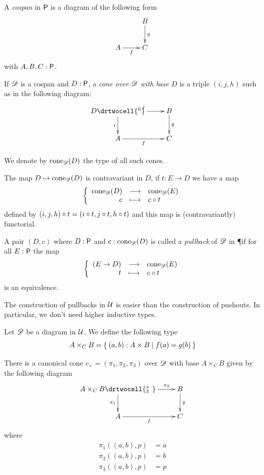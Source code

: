 \begin{defn}
  A \emph{cospan} in $\P$ is a diagram of the following form
  \[\xymatrix{& B \ar^g[d] \\ A \ar_f[r] & C}\]
  with $A,B,C:\P$.
\end{defn}

\begin{defn}
  If $\Ddiag$ is a cospan and $D:\P$, a \emph{cone over $\Ddiag$ with
    base $D$} is a triple $(i,j,h)$ such as in the following diagram:
  \[\uppercurveobject{{ }}\lowercurveobject{{ }}\twocellhead{{ }}
  \xymatrix{D \ar^j[r] \ar_i[d] \drtwocell{^h} & B \ar^g[d] \\
    A \ar_f[r] & C
  }\]

  We denote by $\cone{\Ddiag}{D}$ the type of all such cones.
\end{defn}

The map $D\mapsto\cone{\Ddiag}{D}$ is contravariant in $D$, if $t:E\to{}D$ we
have a map
\[\function{\cone{\Ddiag}{D}}{\cone{\Ddiag}{E}}{c}{\composecone{t}{c}}\]
defined by $\composecone{t}{(i,j,h)}=(i\circ{}t,j\circ{}t,h\circ{}t)$ and this
map is (contravariantly) functorial.

\begin{defn}
  A pair $(D,c)$ where $D:\P$ and $c:\cone{\Ddiag}{D}$ is called a
  \emph{pullback} of $\Ddiag$ in \P if for all $E:\P$ the map
  \[\function{(E\to{}D)}{\cone{\Ddiag}{E}}{t}{\composecone{t}{c}}\]
  is an equivalence.
\end{defn}

The construction of pullbacks in $\type$ is easier than the construction of
pushouts.
In particular, we don't need higher inductive types.

\begin{defn}
  Let $\Ddiag$ be a diagram in $\type$. We define the following type
  \[A\times_CB=\setof{(a,b):A\times{}B | f(a) = g(b)}\]

  There is a canonical cone $c_\times=(\pi_1,\pi_2,\pi_3)$ over $\Ddiag$ with
  base $A\times_CB$ given by the following diagram
  \[\uppercurveobject{{ }}\lowercurveobject{{ }}\twocellhead{{ }}
  \xymatrix{A\times_CB \ar^-{\pi_2}[r] \ar_{\pi_1}[d] \drtwocell{^\pi_3\ }
    & B \ar^g[d] \\ A \ar_f[r] & C}\]
  where
  \begin{align*}
    \pi_1((a,b),p)&=a\\
    \pi_2((a,b),p)&=b\\
    \pi_3((a,b),p)&=p\\
  \end{align*}
\end{defn}

